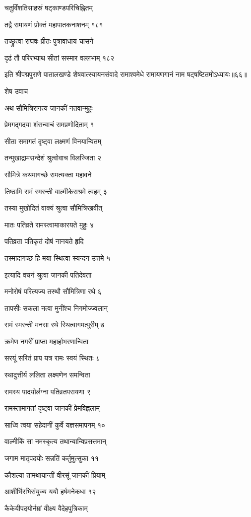 चतुर्विंशतिसाहस्रं षट्काण्डपरिचिह्नितम्

तद्वै रामायणं प्रोक्तं महापातकनाशनम् १८१

तच्छ्रुत्वा राघवः प्रीतः पुत्रावाधाय चासने

दृढं तौ परिरभ्याथ सीतां सस्मार वल्लभाम् १८२

इति श्रीपद्मपुराणे पातालखण्डे शेषवात्स्यायनसंवादे रामाश्वमेधे रामायणगानं नाम षट्षष्टितमोऽध्यायः॥६६॥


शेष उवाच

अथ सौमित्रिरागत्य जानकीं नतवान्मुहुः

प्रेमगद्गदया शंसन्वाचं रामप्रणोदिताम् १

सीता समागतं दृष्ट्वा लक्ष्मणं विनयान्वितम्

तन्मुखाद्रामसन्देशं श्रुत्वोवाच विलज्जिता २

सौमित्रे कथमागच्छे रामत्यक्ता महावने

तिष्ठामि रामं स्मरन्ती वाल्मीकेराश्रमे त्वहम् ३

तस्या मुखोदितं वाक्यं श्रुत्वा सौमित्रिरब्रवीत्

मातः पतिव्रते रामस्त्वामाकारयते मुहुः ४

पतिव्रता पतिकृतं दोषं नानयते हृदि

तस्मादागच्छ हि मया स्थित्वा स्यन्दन उत्तमे ५

इत्यादि वचनं श्रुत्वा जानकी पतिदेवता

मनोरोषं परित्यज्य तस्थौ सौमित्रिणा रथे ६

तापसीः सकला नत्वा मुनींश्च निगमोज्ज्वलान्

रामं स्मरन्ती मनसा रथे स्थित्वागमत्पुरीम् ७

क्रमेण नगरीं प्राप्ता महार्हाभरणान्विता

सरयूं सरितं प्राप यत्र रामः स्वयं स्थितः ८

रथादुत्तीर्य ललिता लक्ष्मणेन समन्विता

रामस्य पादयोर्लग्ना पतिव्रतपरायणा ९

रामस्तामागतां दृष्ट्वा जानकीं प्रेमविह्वलाम्

साध्वि त्वया सहेदानीं कुर्वे यज्ञसमापनम् १०

वाल्मीकिं सा नमस्कृत्य तथान्यान्विप्रसत्तमान्

जगाम मातृपदयोः सन्नतिं कर्तुमुत्सुका ११

कौशल्या तामथायान्तीं वीरसूं जानकीं प्रियाम्

आशीर्भिरभिसंयुज्य ययौ हर्षमनेकधा १२

कैकेयीपदयोर्नम्रां वीक्ष्य वैदेहपुत्रिकाम्

